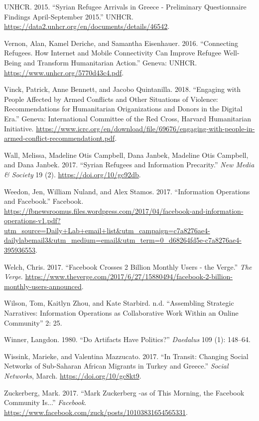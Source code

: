 \begin{cslreferences}
\leavevmode\hypertarget{ref-UNHCR2015Syrian}{}%
UNHCR. 2015. ``Syrian Refugee Arrivals in Greece - Preliminary
Questionnaire Findings April-September 2015.'' UNHCR.
\url{https://data2.unhcr.org/en/documents/details/46542}.

\leavevmode\hypertarget{ref-Vernon2016Connecting}{}%
Vernon, Alan, Kamel Deriche, and Samantha Eisenhauer. 2016. ``Connecting
Refugees. How Internet and Mobile Connectivity Can Improve Refugee
Well-Being and Transform Humanitarian Action.'' Geneva: UNHCR.
\url{https://www.unhcr.org/5770d43c4.pdf}.

\leavevmode\hypertarget{ref-Vinck2018Engaging}{}%
Vinck, Patrick, Anne Bennett, and Jacobo Quintanilla. 2018. ``Engaging
with People Affected by Armed Conflicts and Other Situations of
Violence: Recommendations for Humanitarian Origanizations and Donors in
the Digital Era.'' Geneva: International Committee of the Red Cross,
Harvard Humanitarian Initiative.
\url{https://www.icrc.org/en/download/file/69676/engaging-with-people-in-armed-conflict-recommendationt.pdf}.

\leavevmode\hypertarget{ref-Wall2017Syrian}{}%
Wall, Melissa, Madeline Otis Campbell, Dana Janbek, Madeline Otis
Campbell, and Dana Janbek. 2017. ``Syrian Refugees and Information
Precarity.'' \emph{New Media \& Society} 19 (2).
\url{https://doi.org/10/gc92db}.

\leavevmode\hypertarget{ref-Weedon2017Information}{}%
Weedon, Jen, William Nuland, and Alex Stamos. 2017. ``Information
Operations and Facebook.'' Facebook.
\url{https://fbnewsroomus.files.wordpress.com/2017/04/facebook-and-information-operations-v1.pdf?utm_source=Daily+Lab+email+list\&utm_campaign=c7a8276ae4-dailylabemail3\&utm_medium=email\&utm_term=0_d68264fd5e-c7a8276ae4-395936553}.

\leavevmode\hypertarget{ref-WelchChris2017Facebook}{}%
Welch, Chris. 2017. ``Facebook Crosses 2 Billion Monthly Users - the
Verge.'' \emph{The Verge}.
\url{https://www.theverge.com/2017/6/27/15880494/facebook-2-billion-monthly-users-announced}.

\leavevmode\hypertarget{ref-WilsonAssembling}{}%
Wilson, Tom, Kaitlyn Zhou, and Kate Starbird. n.d. ``Assembling
Strategic Narratives: Information Operations as Collaborative Work
Within an Online Community'' 2: 25.

\leavevmode\hypertarget{ref-Winner1980Do}{}%
Winner, Langdon. 1980. ``Do Artifacts Have Politics?'' \emph{Daedalus}
109 (1): 148--64.

\leavevmode\hypertarget{ref-Wissink2017In}{}%
Wissink, Marieke, and Valentina Mazzucato. 2017. ``In Transit: Changing
Social Networks of Sub-Saharan African Migrants in Turkey and Greece.''
\emph{Social Networks}, March. \url{https://doi.org/10/gc8kt9}.

\leavevmode\hypertarget{ref-Zuckerberg2017Mark}{}%
Zuckerberg, Mark. 2017. ``Mark Zuckerberg -as of This Morning, the
Facebook Community Is...'' \emph{Facebook}.
\url{https://www.facebook.com/zuck/posts/10103831654565331}.
\end{cslreferences}
